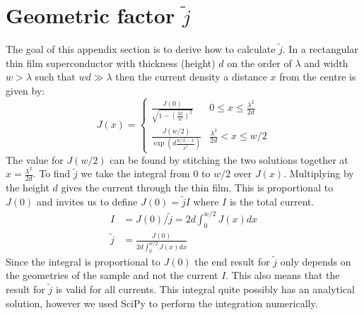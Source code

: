 \section{Geometric factor $\tilde{j}$}
\label{app:derivation-geometric-factor-j}
The goal of this appendix section is to derive how to calculate $\tilde{j}$. In a rectangular thin film superconductor with thickness (height) $d$ on the order of $\lambda$ and width $w > \lambda$ such that $wd \gg \lambda$ then the current density a distance $x$ from the centre is given by\cite{rhoderickCurrentDistributionThin1962}:
\begin{equation}
	J(x) = \begin{cases}
		\frac{J(0)}{\sqrt{1 - \left(\frac{2x}{w}\right)^2}} & 0 \leq x \leq \frac{\lambda^2}{2d} \\
		\frac{J(w/2)}{\exp\left(d\frac{w/2 - x}{\lambda^2} \right)} & \frac{\lambda^2}{2d} < x \leq w/2
	\end{cases}
\end{equation}
The value for $J(w/2)$ can be found by stitching the two solutions together at $x = \frac{\lambda^2}{2d}$. To find $\tilde{j}$ we take the integral from $0$ to $w/2$ over $J(x)$. Multiplying by the height $d$ gives the current through the thin film. This is proportional to $J(0)$ and invites us to define $J(0) = \tilde{j}I$ where $I$ is the total current. 
\begin{align}
	I &= J(0) / \tilde{j} = 2d \int_0^{w/2} J(x)dx \nonumber \\
	\tilde{j} &= \frac{J(0)}{2d \int_0^{w/2} J(x)dx}
	\label{eqn:geometric-factor-j}
\end{align}
Since the integral is proportional to $J(0)$ the end result for $\tilde{j}$ only depends on the geometries of the sample and not the current $I$. This also means that the result for $\tilde{j}$ is valid for all currents. This integral quite possibly has an analytical solution, however we used SciPy to perform the integration numerically.